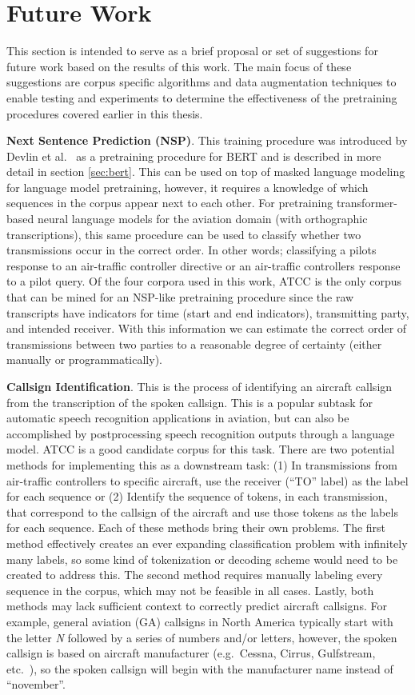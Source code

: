 \documentclass[12pt]{article}
\begin{document}
\section{Future Work}\label{sec:future_work}
This section is intended to serve as a brief proposal or set of suggestions for future work based on the results of this work. The main focus of these
suggestions are corpus specific algorithms and data augmentation techniques to enable testing and experiments to determine the effectiveness of the
pretraining procedures covered earlier in this thesis.

\textbf{Next Sentence Prediction (NSP)}. This training procedure was introduced by Devlin et al.~\cite{devlin_bert_2019} as a pretraining procedure
for BERT and is described in more detail in section \ref{sec:bert}. This can be used on top of masked language modeling for language model
pretraining, however, it requires a knowledge of which sequences in the corpus appear next to each other. For pretraining transformer-based neural
language models for the aviation domain (with orthographic transcriptions), this same procedure can be used to classify whether two transmissions
occur in the correct order. In other words; classifying a pilots response to an air-traffic controller directive or an air-traffic controllers
response to a pilot query. Of the four corpora used in this work, ATCC is the only corpus that can be mined for an NSP-like pretraining procedure
since the raw transcripts have indicators for time (start and end indicators), transmitting party, and intended receiver. With this information we can
estimate the correct order of transmissions between two parties to a reasonable degree of certainty (either manually or programmatically).

\textbf{Callsign Identification}. This is the process of identifying an aircraft callsign from the transcription of the spoken callsign. This is a
popular subtask for automatic speech recognition applications in aviation, but can also be accomplished by postprocessing speech recognition outputs
through a language model. ATCC is a good candidate corpus for this task. There are two potential methods for implementing this as a downstream task:
(1) In transmissions from air-traffic controllers to specific aircraft, use the receiver (``TO'' label) as the label for each sequence or (2) Identify
the sequence of tokens, in each transmission, that correspond to the callsign of the aircraft and use those tokens as the labels for each sequence.
Each of these methods bring their own problems. The first method effectively creates an ever expanding classification problem with infinitely many
labels, so some kind of tokenization or decoding scheme would need to be created to address this. The second method requires manually labeling every
sequence in the corpus, which may not be feasible in all cases. Lastly, both methods may lack sufficient context to correctly predict aircraft
callsigns. For example, general aviation (GA) callsigns in North America typically start with the letter \textit{N} followed by a series of numbers
and/or letters, however, the spoken callsign is based on aircraft manufacturer (e.g.~Cessna, Cirrus, Gulfstream, etc.~), so the spoken callsign will
begin with the manufacturer name instead of ``november''.
\end{document}
